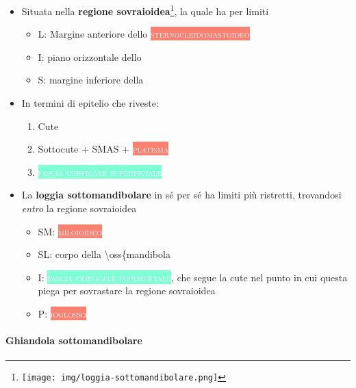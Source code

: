 \documentclass[italian,]{article}
\providecommand{\tightlist}{%
  \setlength{\itemsep}{0pt}\setlength{\parskip}{0pt}}
\newcommand{\mus}[1]{\colorbox{Salmon}{\textcolor{white}{\textsc{#1}}}}
\newcommand{\oss}[1]{\colorbox{ossa}{\textcolor{white}{\textsc{#1}}}}
\newcommand{\tol}[1]{\colorbox{Aquamarine}{\textcolor{white}{\textsc{#1}}}}
\begin{document}
\begin{itemize}
\tightlist
\item
  Situata nella \textbf{regione sovraioidea}\footnote{\texttt{[image: img/loggia-sottomandibolare.png]}},
  la quale ha per limiti

  \begin{itemize}
  \tightlist
  \item
    L: Margine anteriore dello \mus{sternocleidomastoideo}
  \item
    I: piano orizzontale dello \oss{ioide}
  \item
    S: margine inferiore della \oss{mandibola}
  \end{itemize}
\item
  In termini di epitelio che riveste:

  \begin{enumerate}
  \def\labelenumi{\arabic{enumi}.}
  \tightlist
  \item
    Cute
  \item
    Sottocute + SMAS + \mus{platisma}
  \item
    \tol{fascia cervicale superficiale}~
  \end{enumerate}
\item
  La \textbf{loggia sottomandibolare} in sé per sé ha limiti più
  ristretti, trovandosi \emph{entro} la regione sovraioidea

  \begin{itemize}
  \tightlist
  \item
    SM: \mus{miloioideo}
  \item
    SL: corpo della \textbackslash{}oss\{mandibola
  \item
    I: \tol{fascia cervicale superficiale}, che segue la cute nel punto
    in cui questa piega per sovrastare la regione sovraioidea
  \item
    P: \mus{ioglosso}~
  \end{itemize}
\end{itemize}

\hypertarget{ghiandola-sottomandibolare}{%
\paragraph{Ghiandola
sottomandibolare}\label{ghiandola-sottomandibolare}}
\end{document}
